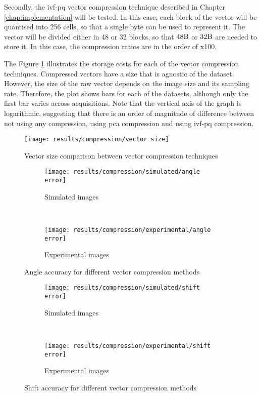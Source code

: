\documentclass[../main.tex]{subfiles}
\begin{document}
Secondly, the \gls{ivf}-\gls{pq} vector compression technique described in Chapter \ref{chap:implementation} will be tested. In this case, each block of the vector will be quantised into 256 cells, so that a single byte can be used to represent it. The vector will be divided either in 48 or 32 blocks, so that $48\si{\byte}$ or $32\si{\byte}$ are needed to store it. In this case, the compression ratios are in the order of x100.

The Figure \ref{fig:5:vector_size} illustrates the storage costs for each of the vector compression techniques. Compressed vectors have a size that is agnostic of the dataset. However, the size of the raw vector depends on the image size and its sampling rate. Therefore, the plot shows bars for each of the datasets, although only the first bar varies across acquisitions. Note that the vertical axis of the graph is logarithmic, suggesting that there is an order of magnitude of difference between not using any compression, using \gls{pca} compression and using \gls{ivf}-\gls{pq} compression.

\begin{figure}[htbp]
    \centering
    \texttt{[image: results/compression/vector size]}
    \caption{Vector size comparison between vector compression techniques}
    \label{fig:5:vector_size}
\end{figure}


\begin{figure}[htbp]
    \centering
    \begin{subfigure}[b]{.8\textwidth}
         \centering
         \texttt{[image: results/compression/simulated/angle error]}
         \caption{Simulated images}
    \end{subfigure}\\
    \vspace{2em}
    \begin{subfigure}[b]{.8\textwidth}
         \centering
         \texttt{[image: results/compression/experimental/angle error]}
         \caption{Experimental images}
    \end{subfigure}
    \caption{Angle accuracy for different vector compression methods}
    \label{fig:5:compression_angle_accuracy}
\end{figure}

\begin{figure}[htbp]
    \centering
    \begin{subfigure}[b]{.8\textwidth}
         \centering
         \texttt{[image: results/compression/simulated/shift error]}
         \caption{Simulated images}
    \end{subfigure}\\
    \vspace{2em}
    \begin{subfigure}[b]{.8\textwidth}
         \centering
         \texttt{[image: results/compression/experimental/shift error]}
         \caption{Experimental images}
    \end{subfigure}
    \caption{Shift accuracy for different vector compression methods}
    \label{fig:5:compression_shift_accuracy}
\end{figure}
\end{document}
